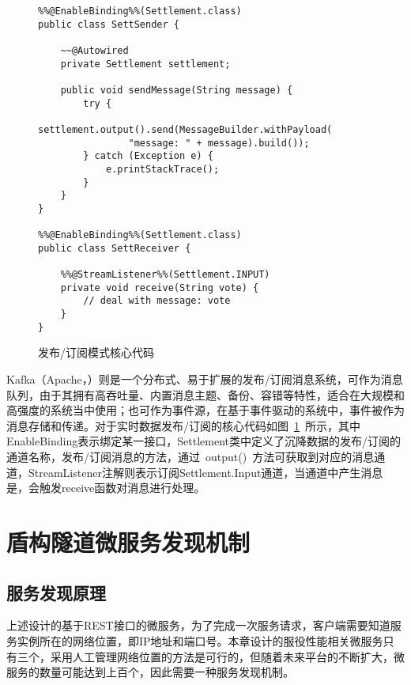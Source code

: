 \begin{figure}[htb!]
\centering
\begin{minipage}[t]{1.0\linewidth}
\begin{lstlisting}
%%@EnableBinding%%(Settlement.class)  
public class SettSender {  
      
    ~~@Autowired  
    private Settlement settlement;  
      
    public void sendMessage(String message) {  
	    try {  
	        settlement.output().send(MessageBuilder.withPayload(
	        	"message: " + message).build());  
	    } catch (Exception e) {  
	        e.printStackTrace();  
	    }  
    }  
}

%%@EnableBinding%%(Settlement.class)  
public class SettReceiver {  
  
    %%@StreamListener%%(Settlement.INPUT)  
    private void receive(String vote) {  
        // deal with message: vote
    }     
}  
\end{lstlisting}
\end{minipage} 
\caption{发布/订阅模式核心代码}
\label{fig:发布订阅模式核心代码}
\end{figure}

Kafka（Apache，\citeyear{kafka2017}）则是一个分布式、易于扩展的发布/订阅消息系统，可作为消息队列，由于其拥有高吞吐量、内置消息主题、备份、容错等特性，适合在大规模和高强度的系统当中使用；也可作为事件源，在基于事件驱动的系统中，事件被作为消息存储和传递。对于实时数据发布/订阅的核心代码如图~\ref{fig:发布订阅模式核心代码}~所示，其中EnableBinding表示绑定某一接口，Settlement类中定义了沉降数据的发布/订阅的通道名称，发布/订阅消息的方法，通过~output()~方法可获取到对应的消息通道，StreamListener注解则表示订阅Settlement.Input通道，当通道中产生消息是，会触发receive函数对消息进行处理。

\section{盾构隧道微服务发现机制}
\label{chap:service-discovery}

\subsection{服务发现原理}
上述设计的基于REST接口的微服务，为了完成一次服务请求，客户端需要知道服务实例所在的网络位置，即IP地址和端口号。本章设计的服役性能相关微服务只有三个，采用人工管理网络位置的方法是可行的，但随着未来平台的不断扩大，微服务的数量可能达到上百个，因此需要一种服务发现机制。

